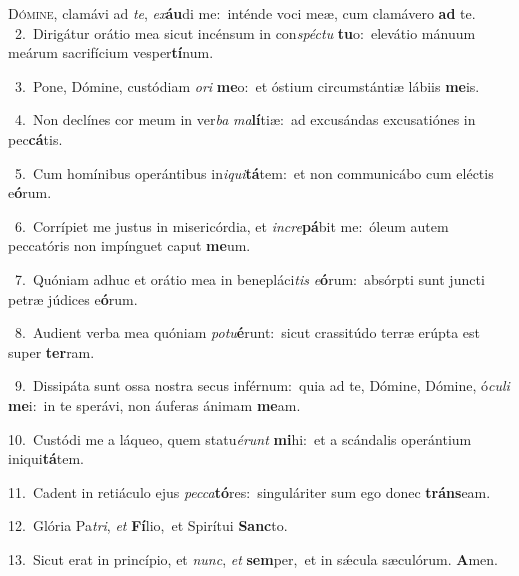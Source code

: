 \lettrine{\initial\textcolor{\initialcolor}{D}}{ómine,} clamávi ad \textit{te}\-, \textit{ex}\-\textbf{áu}di me:~\star inténde voci meæ, cum clamávero \textbf{ad} te.\\
{\numbfont\textcolor{\numbcolor}{~2.}}~Dirigátur orátio mea sicut incénsum in con\-\textit{spéc}\-\textit{tu} \textbf{tu}\-o:~\star elevátio mánuum meárum sacrifícium vesper\-\textbf{tí}\-num.\par
{\numbfont\textcolor{\numbcolor}{~3.}}~Pone, Dómine, custódiam \textit{o}\-\textit{ri} \textbf{me}\-o:~\star et óstium circumstántiæ lábiis \textbf{me}\-is.\par
{\numbfont\textcolor{\numbcolor}{~4.}}~Non declínes cor meum in ver\textit{ba} \textit{ma}\-\textbf{lí}tiæ:~\star ad excusándas excusatiónes in pec\-\textbf{cá}\-tis.\par
{\numbfont\textcolor{\numbcolor}{~5.}}~Cum homínibus operántibus in\-\textit{i}\-\textit{qui}\textbf{tá}tem:~\star et non communicábo cum eléctis e\-\textbf{ó}\-rum.\par
{\numbfont\textcolor{\numbcolor}{~6.}}~Corrípiet me justus in misericórdia, et \textit{in}\-\textit{cre}\textbf{pá}bit me:~\star óleum autem peccatóris non impínguet caput \textbf{me}\-um.\par
{\numbfont\textcolor{\numbcolor}{~7.}}~Quóniam adhuc et orátio mea in benepláci\textit{tis} \textit{e}\-\textbf{ó}rum:~\star absórpti sunt juncti petræ júdices e\-\textbf{ó}\-rum.\par
{\numbfont\textcolor{\numbcolor}{~8.}}~Audient verba mea quóniam \textit{pot}\-\textit{u}\textbf{é}runt:~\star sicut crassitúdo terræ erúpta est super \textbf{ter}\-ram.\par
{\numbfont\textcolor{\numbcolor}{~9.}}~Dissipáta sunt ossa nostra secus inférnum:~\dagger quia ad te, Dómine, Dómine, ó\-\textit{cu}\-\textit{li} \textbf{me}\-i:~\star in te sperávi, non áuferas ánimam \textbf{me}\-am.\par
{\numbfont\textcolor{\numbcolor}{10.}}~Custódi me a láqueo, quem statu\-\textit{é}\-\textit{runt} \textbf{mi}\-hi:~\star et a scándalis operántium iniqui\-\textbf{tá}\-tem.\par
{\numbfont\textcolor{\numbcolor}{11.}}~Cadent in retiáculo ejus \textit{pec}\-\textit{ca}\textbf{tó}res:~\star singuláriter sum ego donec \textbf{tráns}\-eam.\par
{\numbfont\textcolor{\numbcolor}{12.}}~Glória Pa\-\textit{tri}\-, \textit{et} \textbf{Fí}\-lio,~\star et Spirítui \textbf{Sanc}\-to.\par
{\numbfont\textcolor{\numbcolor}{13.}}~Sicut erat in princípio, et \textit{nunc}\-, \textit{et} \textbf{sem}\-per,~\star et in sǽcula sæculórum. \textbf{A}\-men.\par
